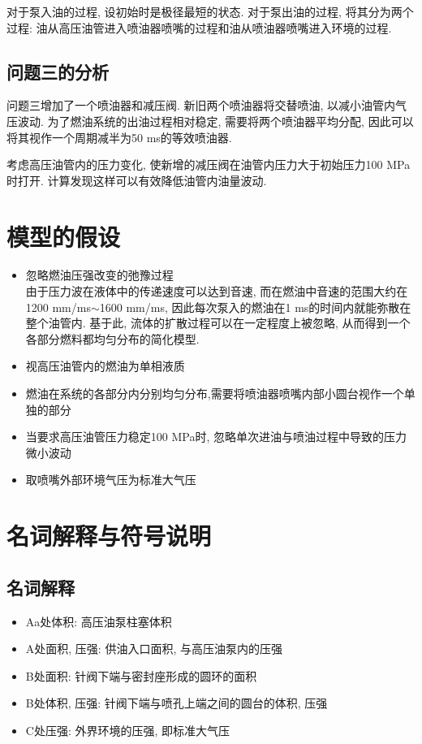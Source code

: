 \documentclass{cumcmthesis}
\begin{document}
对于泵入油的过程, 设初始时是极径最短的状态. 对于泵出油的过程, 将其分为两个过程: 油从高压油管进入喷油器喷嘴的过程和油从喷油器喷嘴进入环境的过程. 
\subsection{问题三的分析}
问题三增加了一个喷油器和减压阀. 新旧两个喷油器将交替喷油, 以减小油管内气压波动. 为了燃油系统的出油过程相对稳定, 需要将两个喷油器平均分配, 因此可以将其视作一个周期减半为50 ms的等效喷油器. 

考虑高压油管内的压力变化, 使新增的减压阀在油管内压力大于初始压力100 MPa时打开. 计算发现这样可以有效降低油管内油量波动.



\section{模型的假设}
\begin{itemize}
    \item 忽略燃油压强改变的弛豫过程\\
        由于压力波在液体中的传递速度可以达到音速\cite{1}, 而在燃油中音速的范围大约在1200 mm/ms$\sim$1600 mm/ms, 因此每次泵入的燃油在1 ms的时间内就能弥散在整个油管内. 基于此, 流体的扩散过程可以在一定程度上被忽略, 从而得到一个各部分燃料都均匀分布的简化模型. 
        \item 视高压油管内的燃油为单相液质\cite{1}
        \item 燃油在系统的各部分内分别均匀分布,需要将喷油器喷嘴内部小圆台视作一个单独的部分
        \item 当要求高压油管压力稳定100 MPa时, 忽略单次进油与喷油过程中导致的压力微小波动
        \item 取喷嘴外部环境气压为标准大气压
\end{itemize}

\section{名词解释与符号说明}
\subsection{名词解释}
\begin{itemize}
    \item Aa处体积: 高压油泵柱塞体积
    \item A处面积, 压强: 供油入口面积, 与高压油泵内的压强
    \item B处面积: 针阀下端与密封座形成的圆环的面积
    \item B处体积, 压强: 针阀下端与喷孔上端之间的圆台的体积, 压强
    \item C处压强: 外界环境的压强, 即标准大气压
\end{itemize}
\end{document}
